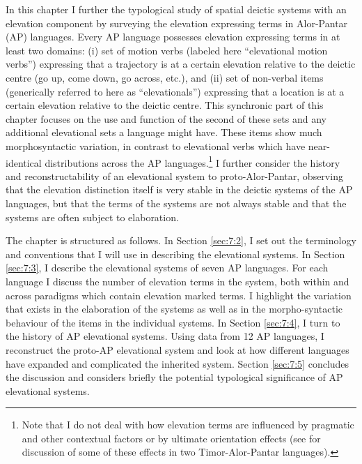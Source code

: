 In this chapter I further the typological study of spatial deictic systems with an elevation component by surveying the elevation expressing terms in Alor-Pantar (AP) languages. Every AP language possesses elevation expressing terms in at least two domains: (i) set of motion verbs (labeled here ``elevational motion verbs'') expressing that a trajectory is at a certain elevation relative to the deictic centre (go up, come down, go across, etc.), and (ii) set of non-verbal items (generically referred to here as ``elevationals'') expressing that a location is at a certain elevation relative to the deictic centre. This synchronic part of this chapter focuses on the use and function of the second of these sets and any additional elevational sets a language might have. These items show much morphosyntactic variation, in contrast to elevational verbs which have near-identical distributions across the AP languages.\footnote{Note that I do not deal with how elevation terms are influenced by pragmatic and other contextual factors or by ultimate orientation effects (see \citealt{Schapper2012} for discussion of some of these effects in two Timor-Alor-Pantar languages).} I further consider the history and reconstructability of an elevational system to proto-Alor-Pantar, observing that the elevation distinction itself is very stable in the deictic systems of the AP languages, but that the terms of the systems are not always stable and that the systems are often subject to elaboration. 

The chapter is structured as follows. In Section \ref{sec:7:2}, I set out the terminology and conventions that I will use in describing the elevational systems. In Section \ref{sec:7:3}, I describe the elevational systems of seven AP languages. For each language I discuss the number of elevation terms in the system, both within and across paradigms which contain elevation marked terms. I highlight the variation that exists in the elaboration of the systems as well as in the morpho-syntactic behaviour of the items in the individual systems. In Section \ref{sec:7:4}, I turn to the history of AP elevational systems. Using data from 12 AP languages, I reconstruct the proto-AP elevational system and look at how different languages have expanded and complicated the inherited system. Section \ref{sec:7:5} concludes the discussion and considers briefly the potential typological significance of AP elevational systems.

